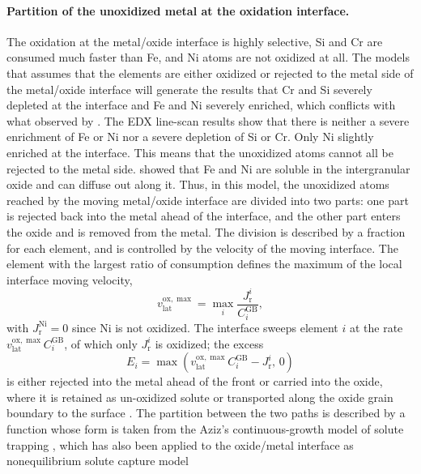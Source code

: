 \documentclass[3p,times,nonatbib]{elsarticle} %
\newcommand{\GB}{\mathrm{GB}}
\newcommand{\lat}{\mathrm{lat}}
\newcommand{\ox}{\mathrm{ox}}
\begin{document}
\paragraph{Partition of the unoxidized metal at the oxidation interface.} 
The oxidation at the metal/oxide interface is highly selective, Si and Cr are consumed much faster than Fe, and Ni atoms are not oxidized at all. The models that assumes that the elements are either oxidized or rejected to the metal side of the metal/oxide interface will generate the results that Cr and Si severely depleted at the interface and Fe and Ni severely enriched, which conflicts with what observed by \textcite{deng2017effect}. The EDX line-scan results show that there is neither a severe enrichment of Fe or Ni nor a severe depletion of Si or Cr. Only Ni slightly enriched at the interface. This means that the unoxidized atoms cannot all be rejected to the metal side. \textcite{deng2020corrosion} showed that Fe and Ni are soluble in the intergranular oxide and can diffuse out along it. Thus, in this model, the unoxidized atoms reached by the moving metal/oxide interface are divided into two parts: one part is rejected back into the metal ahead of the interface, and the other part enters the oxide and is removed from the metal. The division is described by a fraction for each element, and is controlled by the velocity of the moving interface. 
The element with the largest ratio of consumption defines the maximum of the local interface moving velocity,
\begin{equation}
v_{\lat}^{\ox,\max}=\max_{i}\frac{J_{\mathrm{r}}^{i}}{C_i^{\GB}} ,
\label{eq:sweep-velocity}
\end{equation}
with \(J_{\mathrm{r}}^{\mathrm{Ni}}=0\) since Ni is not oxidized. The interface sweeps element \(i\) at the rate \(v_{\lat}^{\ox,\max}C_i^{\GB}\), of which only \(J_{\mathrm{r}}^{i}\) is oxidized; the excess 
\begin{equation}
E_i=\max\!\left(v_{\lat}^{\ox,\max}C_i^{\GB}-J_{\mathrm{r}}^{i},\,0\right)
\label{eq:excess}
\end{equation}
is either rejected into the metal ahead of the front or carried into the oxide,
where it is retained as un-oxidized solute or transported along the oxide grain boundary to the surface \cite{deng2020corrosion}. The partition between the two paths is described by a function whose form is taken from the Aziz's continuous-growth model of solute trapping \cite{aziz1982model,aziz1988continuous}, which has also been applied to
the oxide/metal interface as nonequilibrium solute capture model
\end{document}
